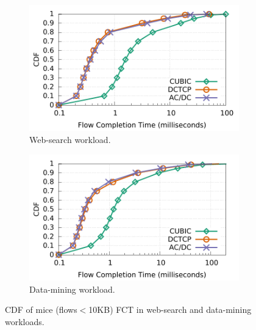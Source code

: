 \begin{figure}[!t]
        \centering
        \begin{subfigure}[b]{0.7\textwidth}
                \centering
                \includegraphics[width=\textwidth]{acdctcp/figures/macro_benchmarks/trace-driven/trace_driven_workload_dctcp_senders5_10points.pdf}
                \caption{Web-search workload.}
                \label{trace-driven-searching-fct}
        \end{subfigure}
        \begin{subfigure}[b]{0.7\textwidth}
                \centering
                \includegraphics[width=\textwidth]{acdctcp/figures/macro_benchmarks/trace-driven/trace_driven_workload_conga_senders5_10points.pdf}
                \caption{Data-mining workload.}
                \label{trace-driven-data-mining-fct}
        \end{subfigure}
        \caption{CDF of mice (flows$<$10KB) FCT in web-search and data-mining workloads.}
        \label{macro-trace-driven-fct}
\end{figure}

